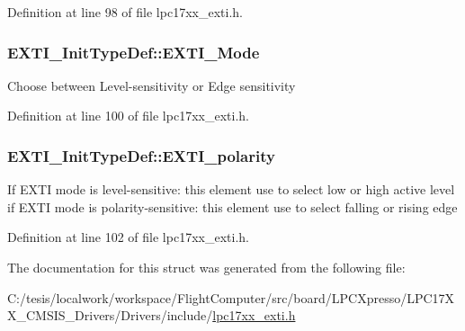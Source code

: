 \-Definition at line 98 of file lpc17xx\-\_\-exti.\-h.

\hypertarget{struct_e_x_t_i___init_type_def_a8e24dfd6a85efbfd421814e76c33a4ad}{
\subsubsection[{\-E\-X\-T\-I\-\_\-\-Mode}]{ {\bf \-E\-X\-T\-I\-\_\-\-Init\-Type\-Def\-::\-E\-X\-T\-I\-\_\-\-Mode}}}\label{struct_e_x_t_i___init_type_def_a8e24dfd6a85efbfd421814e76c33a4ad}
\-Choose between \-Level-\/sensitivity or \-Edge sensitivity 

\-Definition at line 100 of file lpc17xx\-\_\-exti.\-h.

\hypertarget{struct_e_x_t_i___init_type_def_a2e61c10ab5ab19467405d62beb2e917a}{
\subsubsection[{\-E\-X\-T\-I\-\_\-polarity}]{ {\bf \-E\-X\-T\-I\-\_\-\-Init\-Type\-Def\-::\-E\-X\-T\-I\-\_\-polarity}}}\label{struct_e_x_t_i___init_type_def_a2e61c10ab5ab19467405d62beb2e917a}
\-If \-E\-X\-T\-I mode is level-\/sensitive\-: this element use to select low or high active level if \-E\-X\-T\-I mode is polarity-\/sensitive\-: this element use to select falling or rising edge 

\-Definition at line 102 of file lpc17xx\-\_\-exti.\-h.



\-The documentation for this struct was generated from the following file\-:\begin{DoxyCompactItemize}
\item 
\-C\-:/tesis/localwork/workspace/\-Flight\-Computer/src/board/\-L\-P\-C\-Xpresso/\-L\-P\-C17\-X\-X\-\_\-\-C\-M\-S\-I\-S\-\_\-\-Drivers/\-Drivers/include/\hyperlink{lpc17xx__exti_8h}{lpc17xx\-\_\-exti.\-h}\end{DoxyCompactItemize}

